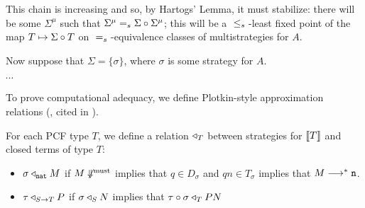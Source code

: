 \documentclass{article}
\begin{document}
This chain is increasing and so, by Hartogs' Lemma, it must stabilize: there will be some $\Sigma^\mu$ such that $\Sigma^\mu{\;=_s\;}\Sigma \circ \Sigma^\mu$; this will be a ${\;\le_s\;}$-least fixed point of the map $T\mapsto\Sigma \circ T$ on ${\;=_s\;}$-equivalence classes of multistrategies for $A$.

Now suppose that $\Sigma = \{\sigma\}$, where $\sigma$ is some strategy for $A$.

$\cdots$

To prove computational adequacy, we define Plotkin-style approximation relations (\cite{PlotkinApRels}, cited in \cite{LairdOrdinalGames}).  

\begin{definition}
  For each PCF type $T$, we define a relation $\triangleleft_T$ between strategies for $\left\llbracket T\right\rrbracket$ and closed terms of type $T$:

  \begin{itemize}
    \item $\sigma \triangleleft_{\mathtt{nat}} M$ if $M\not\Downarrow^{\text{must}}$ implies that $q\in D_\sigma$ and $qn\in T_\sigma$ implies that $M\longrightarrow^* {\mathtt{n}}$.
    \item $\tau \triangleleft_{S\to T} P$ if $\sigma\triangleleft_S N$ implies that $\tau \circ \sigma \triangleleft_T P N$
  \end{itemize}
\end{definition}
\end{document}
